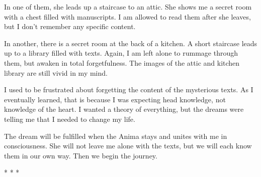 In one of them, she leads up a staircase to an attic. She shows me a secret room with a chest filled with manuscripts. I am allowed to read them after she leaves, but I don't remember any specific content.

In another, there is a secret room at the back of a kitchen. A short staircase leads up to a library filled with texts. Again, I am left alone to rummage through them, but awaken in total forgetfulness. The images of the attic and kitchen library are still vivid in my mind.

I used to be frustrated about forgetting the content of the mysterious texts. As I eventually learned, that is because I was expecting head knowledge, not knowledge of the heart. I wanted a theory of everything, but the dreams were telling me that I needed to change my life.

The dream will be fulfilled when the Anima stays and unites with me in consciousness. She will not leave me alone with the texts, but we will each know them in our own way. Then we begin the journey.



\begin{center}* * *\end{center}

